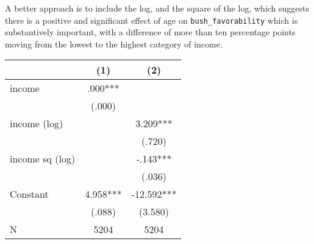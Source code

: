 \documentclass[12pt]{article}
\begin{document}
\begin{enumerate}
%
%
%


A better approach is to include the log, and the square of the log, which suggests there is a positive and significant effect of age on \verb|bush_favorability| which is substantively important, with a difference of more than ten percentage points moving from the lowest to the highest category of income.

\begin{table}[H] \centering
\begin{tabular}{l*{2}{c}}
\hline\hline
                                                  &\multicolumn{1}{c}{(1)}&\multicolumn{1}{c}{(2)}\\

\hline
income &        .000***&               \\
                                                  &      (.000)   &               \\
income (log)                                           &               &       3.209***\\
                                                  &               &      (.720)   \\
income sq (log)                                      &               &       -.143***\\
                                                  &               &      (.036)   \\
Constant                                          &       4.958***&     -12.592***\\
                                                  &      (.088)   &     (3.580)   \\
\hline
N                                                 &        5204   &        5204   \\
\hline\hline
\end{tabular}
\end{table}



\end{enumerate}
\end{document}
